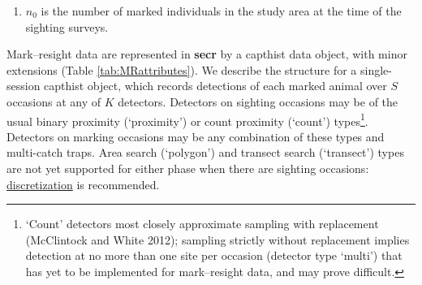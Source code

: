 \documentclass[
]{book}
\providecommand{\tightlist}{%
  \setlength{\itemsep}{0pt}\setlength{\parskip}{0pt}}
\begin{document}
\begin{enumerate}
\def\labelenumi{\arabic{enumi}.}
\tightlist
\item
  \(n_0\) is the number of marked individuals in the study area at the time of the sighting surveys.
\end{enumerate}

Mark--resight data are represented in \textbf{secr} by a capthist data object, with minor extensions (Table \ref{tab:MRattributes}). We describe the structure for a single-session capthist object, which records detections of each marked animal over \(S\) occasions at any of \(K\) detectors. Detectors on sighting occasions may be of the usual binary proximity (`proximity') or count proximity (`count') types\footnote{`Count' detectors most closely approximate sampling with replacement (McClintock and White 2012); sampling strictly without replacement implies detection at no more than one site per occasion (detector type `multi') that has yet to be implemented for mark--resight data, and may prove difficult.}. Detectors on marking occasions may be any combination of these types and multi-catch traps. Area search (`polygon') and transect search (`transect') types are not yet supported for either phase when there are sighting occasions: \hyperref[areasearches]{discretization} is recommended.
\end{document}
